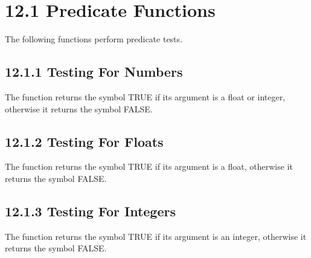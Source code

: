 \documentclass[letterpaper,10pt,english]{sphinxmanual}
\begin{document}
\section{12.1 Predicate Functions}
\label{\detokenize{actions:predicate-functions}}
The following functions perform predicate tests.


\subsection{12.1.1 Testing For Numbers}
\label{\detokenize{actions:testing-for-numbers}}
The  function returns the symbol TRUE if its argument is a
float or integer, otherwise it returns the symbol FALSE.


\begin{sphinxVerbatim}[commandchars=\\\{\}]
 
\end{sphinxVerbatim}


\subsection{12.1.2 Testing For Floats}
\label{\detokenize{actions:testing-for-floats}}
The  function returns the symbol TRUE if its argument is a
float, otherwise it returns the symbol FALSE.


\begin{sphinxVerbatim}[commandchars=\\\{\}]
 
\end{sphinxVerbatim}


\subsection{12.1.3 Testing For Integers}
\label{\detokenize{actions:testing-for-integers}}
The  function returns the symbol TRUE if its argument is an
integer, otherwise it returns the symbol FALSE.


\begin{sphinxVerbatim}[commandchars=\\\{\}]
 
\end{sphinxVerbatim}
\end{document}
